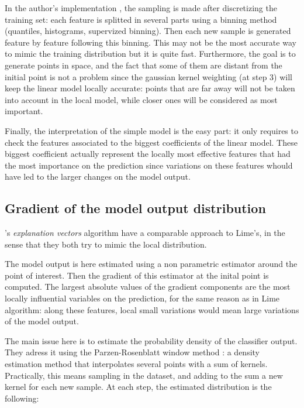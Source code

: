 \documentclass[a4paper,11pt]{kth-mag}
\begin{document}
In the author's implementation \cite{limeGitHub}, the sampling is made after discretizing the training set: each feature is splitted in several parts using a binning method (quantiles, histograms, supervized binning). Then each new sample is generated feature by feature following this binning. This may not be the most accurate way to mimic the training distribution but it is quite fast. Furthermore, the goal is to generate points in space, and the fact that some of them are distant from the initial point is not a problem since the gaussian kernel weighting (at step 3) will keep the linear model locally accurate: points that are far away will not be taken into account in the local model, while closer ones will be considered as most important.

Finally, the interpretation of the simple model is the easy part: it only requires to check the features associated to the biggest coefficients of the linear model. These biggest coefficient actually represent the locally most effective features that had the most importance on the prediction since variations on these features whould have led to the larger changes on the model output.

\subsection{Gradient of the model output distribution}

\citeauthor{explvect}'s \textit{explanation vectors} algorithm \cite{explvect} have a comparable approach to Lime's, in the sense that they both try to mimic the local distribution.

The model output is here estimated using a non parametric estimator around the point of interest. Then the gradient of this estimator at the inital point is computed. The largest absolute values of the gradient components are the most locally influential variables on the prediction, for the same reason as in Lime algorithm: along these features, local small variations would mean large variations of the model output.

The main issue here is to estimate the probability density of the classifier output. They adress it using the Parzen-Rosenblatt window method \cite{parzen} \cite{rosenblatt}: a density estimation method that interpolates several points with a sum of kernels. Practically, this means sampling in the dataset, and adding to the sum a new kernel for each new sample. At each step, the estimated distribution is the following:
\end{document}
